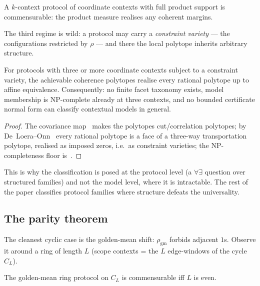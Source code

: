 \begin{theorem}\label{thm:product}
A $k$-context protocol of coordinate contexts with full product support is
commensurable: the product measure realises any coherent margins.
\end{theorem}

The third regime is wild: a protocol may carry a \emph{constraint variety} --- the
configurations restricted by $\rho$ --- and there the local polytope inherits
arbitrary structure.

\begin{theorem}\label{thm:universal}
For protocols with three or more coordinate contexts subject to a constraint
variety, the achievable coherence polytopes realise every rational polytope up
to affine equivalence. Consequently: no finite facet taxonomy exists, model
membership is \textsf{NP}-complete already at three contexts, and no bounded
certificate normal form can classify contextual models in general.
\end{theorem}

\begin{proof}
The covariance map~\cite{AvisImaiItoSasaki2005} makes the polytopes
cut/correlation polytopes; by De~Loera--Onn~\cite{DeLoeraOnn2004} every rational
polytope is a face of a three-way transportation polytope, realised as imposed
zeros, i.e.\ as constraint varieties; the \textsf{NP}-completeness floor
is~\cite{Pitowsky1991}.
\end{proof}

This is why the classification is posed at the protocol level (a $\forall\exists$
question over structured families) and not the model level, where it is
intractable. The rest of the paper classifies protocol families where structure
defeats the universality.


\subsection{The parity theorem}\label{sub:parity}

The cleanest cyclic case is the golden-mean shift: $\rho_{\mathrm{gm}}$ forbids
adjacent $1$s. Observe it around a ring of length $L$ (scope contexts = the $L$
edge-windows of the cycle $C_L$).

\begin{theorem}[parity]\label{thm:parity}
The golden-mean ring protocol on $C_L$ is commensurable iff $L$ is even.
\end{theorem}

